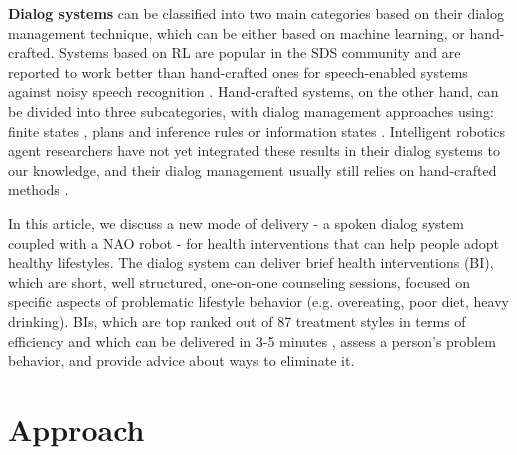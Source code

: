 \documentclass[letterpaper]{article}
\begin{document}
{\bf Dialog systems} can be classified into two main categories based on their dialog management 
technique, which can be either based on machine learning, or hand-crafted.  Systems based on RL are 
popular in the SDS community and are reported to work better than hand-crafted ones for  
speech-enabled systems against noisy speech recognition \cite{young2013pomdp}. 
Hand-crafted systems, on the other hand, can be divided into three subcategories, with dialog 
management approaches using: finite states \cite{sutton1998CSLU}, plans and inference rules 
\cite{ferguson1998trips,Bohus2009} or information states \cite{Traum03}. Intelligent robotics agent 
researchers have not yet integrated these results in their dialog systems to our knowledge, and their dialog management usually still relies on 
hand-crafted methods \cite{morbiniFlores2012,Bickmore2010}. 

In this article, we discuss a new mode of delivery - a spoken dialog system coupled with a NAO robot - 
for health interventions that can help people adopt healthy lifestyles.  The dialog system can 
deliver brief health interventions (BI), which are short, well structured, one-on-one counseling 
sessions, focused on specific aspects of problematic lifestyle behavior (e.g. overeating, poor diet, 
heavy drinking). BIs, which are top ranked out of 87 treatment styles in terms of efficiency 
\cite{miller2002mesa} and which can be delivered in 3-5 minutes \cite{Moyer2002}, assess a person's 
problem behavior, and provide advice about ways to eliminate it. 


\section*{Approach}
\end{document}
